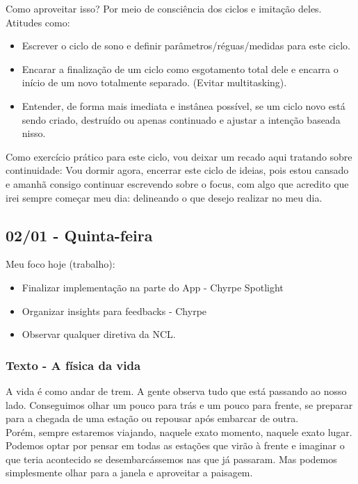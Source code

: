 \documentclass[11pt]{article}
\begin{document}
Como aproveitar isso? Por meio de consciência dos ciclos e imitação deles. Atitudes como:

\begin{itemize}
    \item Escrever o ciclo de sono e definir parâmetros/réguas/medidas para este ciclo. 
    \item Encarar a finalização de um ciclo como esgotamento total dele e encarra o início de um novo totalmente separado. (Evitar multitasking).
    \item Entender, de forma mais imediata e instânea possível, se um ciclo novo está sendo criado, destruído ou apenas continuado e ajustar a intenção baseada nisso.
\end{itemize}

Como exercício prático para este ciclo, vou deixar um recado aqui tratando sobre continuidade: Vou dormir agora, encerrar este ciclo de ideias, pois estou cansado e amanhã consigo continuar escrevendo sobre o focus, com algo que acredito que irei sempre começar meu dia: delineando o que desejo realizar no meu dia.
\pagebreak
\subsection{02/01 - Quinta-feira}

Meu foco hoje (trabalho):

\begin{itemize}
    \item Finalizar implementação na parte do App - Chyrpe Spotlight
    \item Organizar insights para feedbacks - Chyrpe
    \item Observar qualquer diretiva da NCL.
\end{itemize}

\subsubsection{Texto - A física da vida}

A vida é como andar de trem. A gente observa tudo que está passando ao nosso lado. Conseguimos olhar um pouco para trás e um pouco para frente, se preparar para a chegada de uma estação ou repousar após embarcar de outra. \\

Porém, sempre estaremos viajando, naquele exato momento, naquele exato lugar. Podemos optar por pensar em todas as estações que virão à frente e imaginar o que teria acontecido se desembarcássemos nas que já passaram. Mas podemos simplesmente olhar para a janela e aproveitar a paisagem.\\
\end{document}
